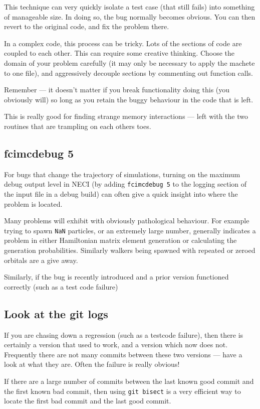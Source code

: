 \documentclass[a4paper,notitlepage]{scrreprt}
\let\code\lstinline
\begin{document}
{{{	This technique can very quickly isolate a test case (that still fails) into
	something of manageable size. In doing so, the bug normally becomes
	obvious. You can then revert to the original code, and fix the problem
	there.

	In a complex code, this process can be tricky. Lots of the sections of code
	are coupled to each other. This can require some creative thinking. Choose
	the domain of your problem carefully (it may only be necessary to apply the
	machete to one file), and aggressively decouple sections by commenting out
	function calls.

	Remember --- it doesn't matter if you break functionality doing this (you
	obviously will) so long as you retain the buggy behaviour in the code that
	is left.

	This is really good for finding strange memory interactions --- left with
	the two routines that are trampling on each others toes.

\subsection{{\ttfamily fcimcdebug 5}}
	For bugs that change the trajectory of simulations, turning on the maximum
	debug output level in NECI (by adding \code{fcimcdebug 5} to the
	logging section of the input file in a debug build) can often give a quick
	insight into where the problem is located.

	Many problems will exhibit with obviously pathological behaviour. For
	example trying to spawn \code{NaN} particles, or an extremely large
	number, generally indicates a problem in either Hamiltonian matrix element
	generation or calculating the generation probabilities. Similarly walkers
	being spawned with repeated or zeroed orbitals are a give away.

	Similarly, if the bug is recently introduced and a prior version functioned
	correctly (such as a test code failure)

\subsection{Look at the git logs}
	If you are chasing down a regression (such as a testcode failure), then
	there is certainly a version that used to work, and a version which now
	does not. Frequently there are not many commits between these two versions
	--- have a look at what they are. Often the failure is really obvious!

	If there are a large number of commits between the last known good commit
	and the first known bad commit, then using \code{git bisect} is a very
	efficient way to locate the first bad commit and the last good commit.


}}}
\end{document}

